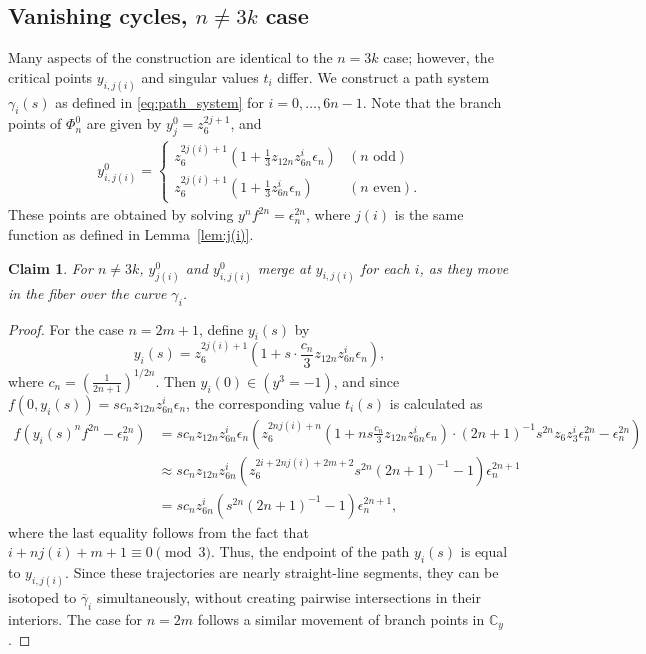 \documentclass[10pt,a4paper,reqno]{amsart}
\newtheorem{claim}[thm]{Claim}
\theoremstyle{definition}
\numberwithin{equation}{section}
\numberwithin{figure}{section}
\newcommand{\C}{\mathbb{C}}
\newcommand{\ep}{\epsilon}
\begin{document}
\subsection{Vanishing cycles, $n\neq3k$ case}
Many aspects of the construction are identical to the $n=3k$ case; however, the critical points $y_{i,j(i)}$ and singular values $t_{i}$ differ. We construct a path system $\gamma_i(s)$ as defined in \eqref{eq:path_system} for $i=0,\dots , 6n-1$. Note that the branch points of $\Phi_n^0$ are given by $y_j^0=z_6^{2j+1}$, and
\begin{align}
y_{i,j(i)}^0= \begin{cases} z_6^{2j(i)+1}(1+ \frac{1}{3} z_{12n}z_{6n}^i {\ep_n}) & (n \text{ odd}) \\
z_6^{2j(i)+1}(1+ \frac{1}{3} z_{6n}^i {\ep_n}) & (n \text{ even}). \end{cases}
\end{align}
These points are obtained by solving $y^{n}f^{2n}={\ep_n^{2n}}$, where $j(i)$ is the same function as defined in Lemma~\ref{lem:j(i)}.

\begin{claim} \label{claim:overlap}
For $n\neq3k$, $y_{j(i)}^0$ and $y_{i,j(i)}^0$ merge at $y_{i,j(i)}$ for each $i$, as they move in the fiber over the curve ${\gamma}_{i}$.
\end{claim}

\begin{proof}
For the case $n=2m+1$, define $y_i(s)$ by
\[y_i(s)=z_6^{2j(i)+1}(1+s \cdot \frac{c_n}{3} z_{12n}z_{6n}^i {\ep_n}),\]
where $c_n=(\frac{1}{2n+1})^{1/2n}$.
Then $y_i(0)\in (y^3=-1)$, and since $f(0,y_i(s))=s c_n z_{12n} z_{6n}^i {\ep_n}$, the corresponding value $t_i(s)$ is calculated as
\begin{align*}
f(y_i(s)^n f^{2n}-{\ep_n^{2n}})&=sc_n z_{12n}z_{6n}^i {\ep_n} (z_6^{2nj(i)+n}(1+ns \frac{c_n}{3}z_{12n}z_{6n}^i {\ep_n}) 
\cdot (2n+1)^{-1} s^{2n} z_6 z_3^i {\ep_n^{2n}} -{\ep_n^{2n}} )\\
&\approx sc_n z_{12n} z_{6n}^i (z_6^{2i+2nj(i)+2m+2} {s^{2n}}{(2n+1)}^{-1} -1){\ep_n^{2n+1}} \\
&= sc_n z_{6n}^i ( {s^{2n}}{(2n+1)}^{-1} -1){\ep_n^{2n+1}},
\end{align*}
where the last equality follows from the fact that $i+nj(i)+m+1\equiv 0 \pmod{3}$.
Thus, the endpoint of the path $y_{i}(s)$ is equal to $y_{i, j(i)}$.
Since these trajectories are nearly straight-line segments, they can be isotoped to $\overline{\gamma}_{i}$ simultaneously, without creating pairwise intersections in their interiors.
The case for $n=2m$ follows a similar movement of branch points in $\C_y$.
\end{proof}
\end{document}

